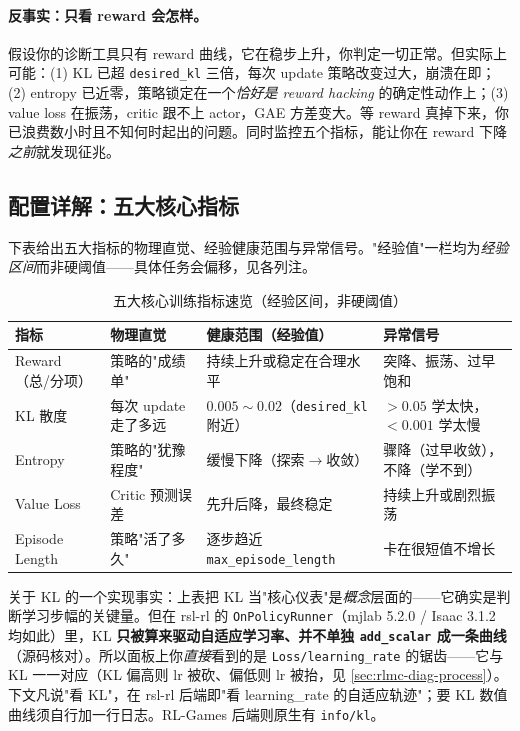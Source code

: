\paragraph{反事实：只看 reward 会怎样。}假设你的诊断工具只有 reward 曲线，它在稳步上升，你判定一切正常。但实际上可能：(1) KL 已超 \verb|desired_kl| 三倍，每次 update 策略改变过大，崩溃在即；(2) entropy 已近零，策略锁定在一个\emph{恰好是 reward hacking} 的确定性动作上；(3) value loss 在振荡，critic 跟不上 actor，GAE 方差变大。等 reward 真掉下来，你已浪费数小时且不知何时起出的问题。同时监控五个指标，能让你在 reward 下降\emph{之前}就发现征兆。

\subsection{配置详解：五大核心指标}

下表给出五大指标的物理直觉、经验健康范围与异常信号。"经验值"一栏均为\emph{经验区间}而非硬阈值——具体任务会偏移，见各列注。

\begin{table}[H]
\centering
\caption{五大核心训练指标速览（经验区间，非硬阈值）}
\label{tab:rlmc-diag-five}
\begin{tabular}{p{2.2cm}p{3.0cm}p{3.4cm}p{3.4cm}}
\hline
指标 & 物理直觉 & 健康范围（经验值） & 异常信号 \\
\hline
Reward（总/分项） & 策略的"成绩单" & 持续上升或稳定在合理水平 & 突降、振荡、过早饱和 \\
KL 散度 & 每次 update 走了多远 & $0.005\sim0.02$（\verb|desired_kl| 附近） & $>0.05$ 学太快，$<0.001$ 学太慢 \\
Entropy & 策略的"犹豫程度" & 缓慢下降（探索$\to$收敛） & 骤降（过早收敛），不降（学不到） \\
Value Loss & Critic 预测误差 & 先升后降，最终稳定 & 持续上升或剧烈振荡 \\
Episode Length & 策略"活了多久" & 逐步趋近 \verb|max_episode_length| & 卡在很短值不增长 \\
\hline
\end{tabular}
\end{table}

\begin{note}
关于 KL 的一个实现事实：上表把 KL 当"核心仪表"是\emph{概念}层面的——它确实是判断学习步幅的关键量。但在 rsl-rl 的 \verb|OnPolicyRunner|（mjlab 5.2.0 / Isaac 3.1.2 均如此）里，KL \textbf{只被算来驱动自适应学习率、并不单独 \texttt{add\_scalar} 成一条曲线}（源码核对）。所以面板上你\emph{直接}看到的是 \verb|Loss/learning_rate| 的锯齿——它与 KL 一一对应（KL 偏高则 lr 被砍、偏低则 lr 被抬，见 \cref{sec:rlmc-diag-process}）。下文凡说"看 KL"，在 rsl-rl 后端即"看 learning\_rate 的自适应轨迹"；要 KL 数值曲线须自行加一行日志。RL-Games 后端则原生有 \verb|info/kl|。
\end{note}

